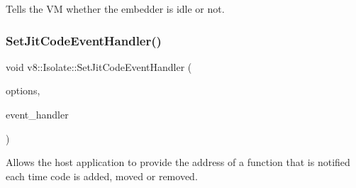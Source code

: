 Tells the VM whether the embedder is idle or not. \mbox{\label{classv8_1_1Isolate_a71d976355bf47eb2dd09cd5d1279a40d}} 
\subsubsection{\texorpdfstring{Set\+Jit\+Code\+Event\+Handler()}{SetJitCodeEventHandler()}}
{\footnotesize\ttfamily void v8\+::\+Isolate\+::\+Set\+Jit\+Code\+Event\+Handler (\begin{DoxyParamCaption}\item[{\mbox{\hyperlink{namespacev8_a06f34fa4fa4cfc8518366808d1d461c1}{Jit\+Code\+Event\+Options}}}]{options,  }\item[{\mbox{\hyperlink{namespacev8_a39243bc91e63d64d111452fdb98c4733}{Jit\+Code\+Event\+Handler}}}]{event\+\_\+handler }\end{DoxyParamCaption})}

Allows the host application to provide the address of a function that is notified each time code is added, moved or removed.


